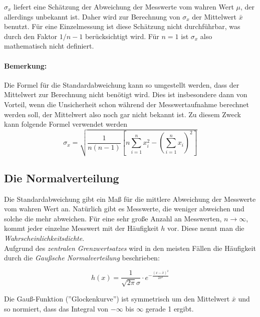 $\sigma_x$ liefert eine Schätzung der Abweichung der Messwerte vom wahren Wert $\mu$, der allerdings unbekannt ist. Daher wird zur Berechnung von $\sigma_x$ der Mittelwert $\bar{x}$ benutzt. Für eine Einzelmessung ist diese Schätzung nicht durchführbar, was durch den Faktor $1/n-1$ berücksichtigt wird. Für $n=1$ ist $\sigma_x$ also mathematisch nicht definiert.

\paragraph{Bemerkung:}

Die Formel für die Standardabweichung kann so umgestellt werden, dass der Mittelwert zur Berechnung nicht benötigt wird. Dies ist insbesondere dann von Vorteil, wenn die Unsicherheit schon während der Messwertaufnahme berechnet werden soll, der Mittelwert also noch gar nicht bekannt ist. Zu diesem Zweck kann folgende Formel verwendet werden
\begin{equation*}
\sigma_x = \sqrt{\frac{1}{n(n-1)}\left[n\sum_{i=1}^n{x_i^2} - \left(\sum_{i=1}^n{x_i} \right)^2\right]}
\end{equation*}

\subsection{Die Normalverteilung}

Die Standardabweichung gibt ein Maß für die mittlere Abweichung der Messwerte vom wahren Wert an. Natürlich gibt es Messwerte, die weniger abweichen und solche die mehr abweichen. Für eine sehr große Anzahl an Messwerten, $n\rightarrow \infty$, kommt jeder einzelne Messwert mit der Häufigkeit $h$ vor. Diese nennt man die \textit{Wahrscheinlichkeitsdichte}. \\
Aufgrund des \textit{zentralen Grenzwertsatzes} wird in den meisten Fällen die Häufigkeit durch die \textit{Gaußsche Normalverteilung} beschrieben:
\begin{hint}
	\begin{equation}
		h(x) = \frac{1}{\sqrt{2\pi}\sigma}\cdot e^{-\frac{\left(x-\bar{x}\right)^2}{2\sigma^2}}
	\end{equation}
\end{hint}

Die Gauß-Funktion (''Glockenkurve'')  ist symmetrisch um den Mittelwert $\bar{x}$ und so normiert, dass das Integral von $-\infty$ bis $\infty$ gerade 1 ergibt. 

